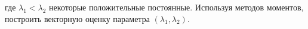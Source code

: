 \documentclass{assignment}
\begin{document}
\begin{enumerate}
    где $\lambda_1 < \lambda_2$ некоторые положительные постоянные. Используя методов моментов, построить векторную оценку параметра $(\lambda_1, \lambda_2)$.
    

\end{enumerate}
\end{document}

